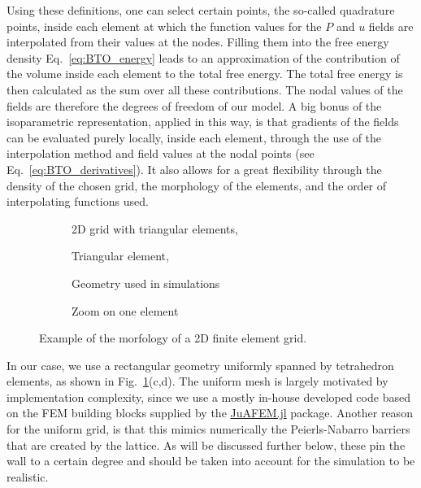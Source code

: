 Using these definitions, one can select certain points, the so-called quadrature points, inside each element at which the function values for the $P$ and $u$ fields are interpolated from their values at the nodes.
Filling them into the free energy density Eq.~\ref{eq:BTO_energy} leads to an approximation of the contribution of the volume inside each element to the total free energy.
The total free energy is then calculated as the sum over all these contributions. 
The nodal values of the fields are therefore the degrees of freedom of our model. 
A big bonus of the isoparametric representation, applied in this way, is that gradients of the fields can be evaluated purely locally, inside each element, through the use of the interpolation method and field values at the nodal points (see Eq.~\ref{eq:BTO_derivatives}).
It also allows for a great flexibility through the density of the chosen grid, the morphology of the elements, and the order of interpolating functions used.

\begin{figure}
	\begin{subfigure}{0.49\textwidth}
		\caption{2D grid with triangular elements, \cite{Biner}}
	\end{subfigure}
	\begin{subfigure}{0.49\textwidth}
		\caption{Triangular element, }
	\end{subfigure}
	\begin{subfigure}{0.49\textwidth}
		\caption{Geometry used in simulations}
	\end{subfigure}
	\begin{subfigure}{0.49\textwidth}
		\caption{Zoom on one element}
	\end{subfigure}
	\caption{\label{fig:BTO_fem} Example of the morfology of a 2D finite element grid.}
\end{figure}

In our case, we use a rectangular geometry uniformly spanned by tetrahedron elements, as shown in Fig.~\ref{fig:BTO_fem}(c,d).
The uniform mesh is largely motivated by implementation complexity, since we use a mostly in-house developed code based on the FEM building blocks supplied by the \href{https://github.com/KristofferC/JuAFEM.jl}{JuAFEM.jl} package.
Another reason for the uniform grid, is that this mimics numerically the Peierls-Nabarro barriers that are created by the lattice.
As will be discussed further below, these pin the wall to a certain degree and should be taken into account for the simulation to be realistic.

